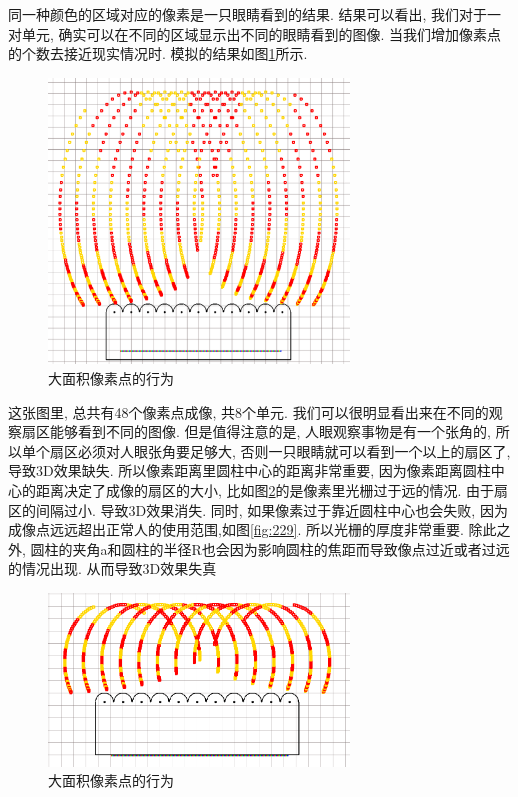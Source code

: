 \documentclass[a4paper, 11pt]{article}
\begin{document}
\begin{CJK}{UTF8}{gbsn}
同一种颜色的区域对应的像素是一只眼睛看到的结果. 结果可以看出, 我们对于一对单元, 确实可以在不同的区域显示出不同的眼睛看到的图像. 当我们增加像素点的个数去接近现实情况时. 模拟的结果如图\ref{fig:225}所示.
\begin{figure}[h!]
  \centerline{\includegraphics[width=8cm]{225.png}}
  \caption{大面积像素点的行为}
  \label{fig:225}
\end{figure}

这张图里, 总共有48个像素点成像, 共8个单元. 我们可以很明显看出来在不同的观察扇区能够看到不同的图像. 但是值得注意的是, 人眼观察事物是有一个张角的, 所以单个扇区必须对人眼张角要足够大, 否则一只眼睛就可以看到一个以上的扇区了, 导致3D效果缺失. 所以像素距离里圆柱中心的距离非常重要, 因为像素距离圆柱中心的距离决定了成像的扇区的大小, 比如图\ref{fig:228}的是像素里光栅过于远的情况. 由于扇区的间隔过小. 导致3D效果消失. 同时, 如果像素过于靠近圆柱中心也会失败, 因为成像点远远超出正常人的使用范围,如图\ref{fig:229}. 所以光栅的厚度非常重要. 除此之外, 圆柱的夹角a和圆柱的半径R也会因为影响圆柱的焦距而导致像点过近或者过远的情况出现. 从而导致3D效果失真
\begin{figure}[h!]
  \centerline{\includegraphics[width=8cm]{228.png}}
  \caption{大面积像素点的行为}
  \label{fig:228}
\end{figure}


\end{CJK}
\end{document}
